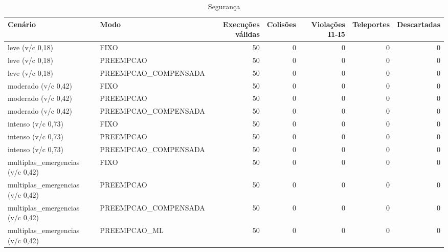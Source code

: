 \begin{table}[htbp]
\centering
\caption{Segurança}
\label{tab:t5}
\small
\begin{tabular}{llrrrrr}
\toprule
Cenário & Modo & Execuções válidas & Colisões & Violações I1-I5 & Teleportes & Descartadas \\
\midrule
leve (v/c 0,18) & FIXO & 50 & 0 & 0 & 0 & 0 \\
leve (v/c 0,18) & PREEMPCAO & 50 & 0 & 0 & 0 & 0 \\
leve (v/c 0,18) & PREEMPCAO\_COMPENSADA & 50 & 0 & 0 & 0 & 0 \\
moderado (v/c 0,42) & FIXO & 50 & 0 & 0 & 0 & 0 \\
moderado (v/c 0,42) & PREEMPCAO & 50 & 0 & 0 & 0 & 0 \\
moderado (v/c 0,42) & PREEMPCAO\_COMPENSADA & 50 & 0 & 0 & 0 & 0 \\
intenso (v/c 0,73) & FIXO & 50 & 0 & 0 & 0 & 0 \\
intenso (v/c 0,73) & PREEMPCAO & 50 & 0 & 0 & 0 & 0 \\
intenso (v/c 0,73) & PREEMPCAO\_COMPENSADA & 50 & 0 & 0 & 0 & 0 \\
multiplas\_emergencias (v/c 0,42) & FIXO & 50 & 0 & 0 & 0 & 0 \\
multiplas\_emergencias (v/c 0,42) & PREEMPCAO & 50 & 0 & 0 & 0 & 0 \\
multiplas\_emergencias (v/c 0,42) & PREEMPCAO\_COMPENSADA & 50 & 0 & 0 & 0 & 0 \\
multiplas\_emergencias (v/c 0,42) & PREEMPCAO\_ML & 50 & 0 & 0 & 0 & 0 \\
\bottomrule
\end{tabular}
\end{table}
